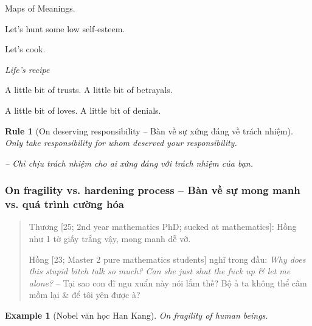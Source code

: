 \documentclass[12pt]{article}
\newtheorem{example}{Example}
\newtheorem{Rule}{Rule}
\begin{document}
Maps of Meanings.

Let's hunt some low self-esteem.

Let's cook.

\begin{center}\it
	{\sc Life's recipe}
	
	A little bit of trusts. A little bit of betrayals.
	
	A little bit of loves. A little bit of denials.
\end{center}

\begin{Rule}[On deserving responsibility -- Bàn về sự xứng đáng về trách nhiệm] 
	Only take responsibility for whom deserved your responsibility.
	
	-- Chỉ chịu trách nhiệm cho ai xứng đáng với trách nhiệm của bạn.
\end{Rule}

\subsubsection{On fragility vs. hardening process -- Bàn về sự mong manh vs. quá trình cường hóa}

\begin{quote}
	{\sf Thương [25; 2nd year mathematics PhD; sucked at mathematics]}: Hồng như 1 tờ giấy trắng vậy, mong manh dễ vỡ.
	
	{\sf Hồng [23; Master 2 pure mathematics students]} nghĩ trong đầu: {\it Why does this stupid bitch talk so much? Can she just shut the fuck up \& let me alone?} -- Tại sao con đĩ ngu xuẩn này nói lắm thế? Bộ ả ta không thể câm mồm lại \& để tôi yên được à?
\end{quote}

\begin{example}[Nobel văn học Han Kang]
	On fragility of human beings.
\end{example}
\end{document}
